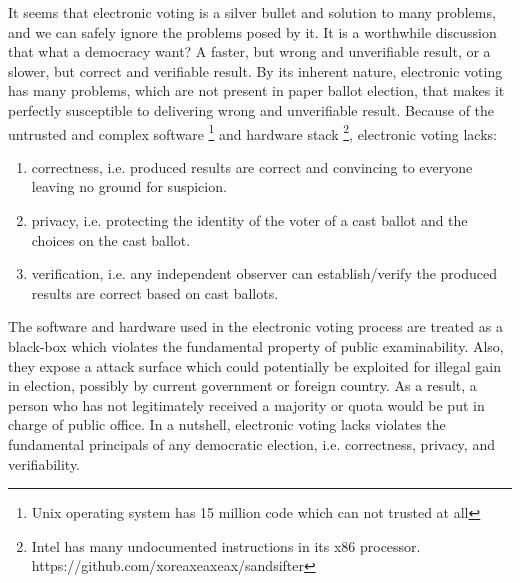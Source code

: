   
   It seems that electronic voting is a silver bullet and solution to many problems, and 
   we can safely ignore the problems posed by it.   It is a worthwhile discussion that 
   what a democracy want? A faster, but wrong and unverifiable result, or a slower, but
   correct and verifiable result.  By its inherent nature, electronic voting has many 
   problems, which are not present in paper ballot election, that makes it perfectly susceptible 
   to delivering wrong and unverifiable result.
   Because of the  untrusted and complex software
    \footnote{Unix operating system has 15 million code which can not trusted at all}
    and hardware stack
 \footnote{Intel has many undocumented instructions in its x86 
 processor. https://github.com/xoreaxeaxeax/sandsifter}, 
   electronic voting lacks:  
   \begin{enumerate}
   \item correctness, i.e. produced results are correct and convincing to everyone leaving 
   no ground for suspicion.
   \item privacy,  i.e.  protecting the identity of the voter of a cast ballot
   and the choices on the cast ballot.
   \item verification, i.e. any independent observer  can establish/verify
    the produced results are correct based on cast ballots. 
   
   
   \end{enumerate}
   
	\noindent
	The software and hardware used in the electronic voting process  
	are treated as a black-box which  violates the 
	fundamental property of  public examinability. Also, they 
	expose a attack surface
	which  could potentially be exploited for illegal gain in election, possibly by 
	current government or foreign country. As a result, a person who has 
	not legitimately received a majority or quota would be  put in charge of public office. 
	In a  nutshell, 
    electronic voting lacks violates the  fundamental principals of any democratic election, i.e.
    correctness, privacy, and verifiability. 
 	

